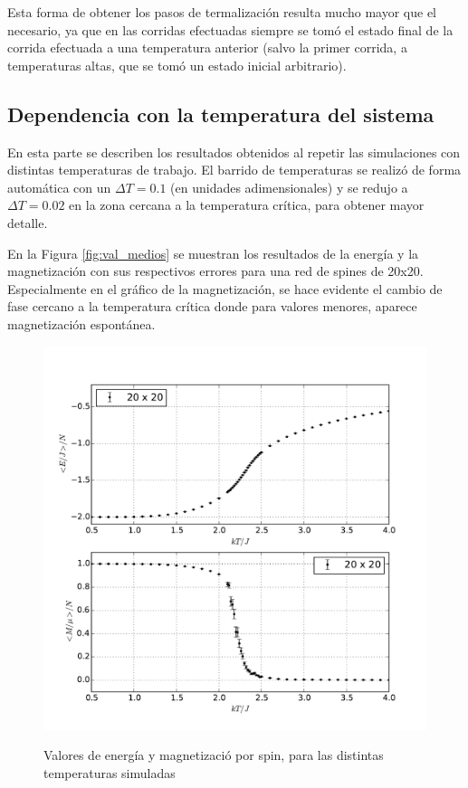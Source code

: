 \documentclass[a4paper,12pt]{article}
\begin{document}
Esta forma de obtener los pasos de termalización resulta mucho mayor que el 
necesario, ya que en las corridas efectuadas siempre se tomó el estado final de 
la corrida efectuada a una temperatura anterior (salvo la primer corrida, a 
temperaturas altas, que se tomó un estado inicial arbitrario).

\newpage

\subsection{Dependencia con la temperatura del sistema}

En esta parte se describen los resultados obtenidos al repetir las simulaciones 
con distintas temperaturas de trabajo. El barrido de temperaturas se realizó de 
forma automática con un $\Delta T = 0.1$ (en unidades adimensionales) y se 
redujo a $\Delta T = 0.02$ en la zona cercana a la temperatura crítica, para 
obtener mayor detalle.

En la Figura \eqref{fig:val_medios} se muestran los resultados de la energía y 
la magnetización con sus respectivos errores para una red de spines de 20x20. 
Especialmente en el gráfico de la magnetización, se hace evidente el cambio de 
fase cercano a la temperatura crítica donde para valores menores, aparece 
magnetización espontánea.

\begin{figure}[H]
    \begin{center}
      \includegraphics[scale=0.7]{val_medios.pdf} \\
      \caption{Valores de energía y magnetizació por spin, para 
      las distintas temperaturas simuladas}\label{fig:val_medios}
    \end{center}
\end{figure}
\end{document}
